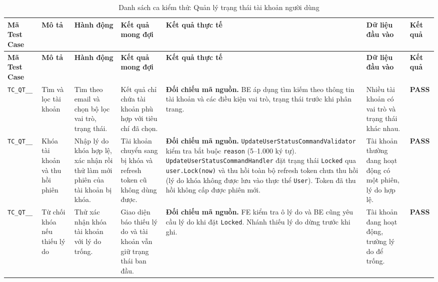 \begin{landscape}
{
\fontsize{9.5}{11.5}\selectfont
\setlength{\tabcolsep}{3pt}
\renewcommand{\arraystretch}{1.2}
\begin{longtable}{|>{\raggedright\arraybackslash}p{2.1cm}|>{\raggedright\arraybackslash}p{2.8cm}|>{\raggedright\arraybackslash}p{3.8cm}|>{\raggedright\arraybackslash}p{4.0cm}|>{\raggedright\arraybackslash}p{5.0cm}|>{\raggedright\arraybackslash}p{3.2cm}|>{\centering\arraybackslash}p{1.3cm}|}
    \caption{Danh sách ca kiểm thử: Quản lý trạng thái tài khoản người dùng} \label{tab:ts-qt-02} \\
    \hline
    \textbf{Mã Test Case} & \textbf{Mô tả} & \textbf{Hành động} & \textbf{Kết quả mong đợi} & \textbf{Kết quả thực tế} & \textbf{Dữ liệu đầu vào} & \textbf{Kết quả} \\
    \hline
    \endfirsthead
    \hline
    \textbf{Mã Test Case} & \textbf{Mô tả} & \textbf{Hành động} & \textbf{Kết quả mong đợi} & \textbf{Kết quả thực tế} & \textbf{Dữ liệu đầu vào} & \textbf{Kết quả} \\
    \hline
    \endhead
    \hline
    \endfoot
    \hline
    \endlastfoot
    \texttt{TC\_\allowbreak QT\_\allowbreak 02\_\allowbreak 01} & Tìm và lọc tài khoản & Tìm theo email và chọn bộ lọc vai trò, trạng thái. & Kết quả chỉ chứa tài khoản phù hợp với tiêu chí đã chọn. & \textbf{Đối chiếu mã nguồn.} BE áp dụng tìm kiếm theo thông tin tài khoản và các điều kiện vai trò, trạng thái trước khi phân trang. & Nhiều tài khoản có vai trò và trạng thái khác nhau. & \textbf{PASS} \\
    \hline
    \texttt{TC\_\allowbreak QT\_\allowbreak 02\_\allowbreak 02} & Khóa tài khoản và thu hồi phiên & Nhập lý do khóa hợp lệ, xác nhận rồi thử làm mới phiên của tài khoản bị khóa. & Tài khoản chuyển sang bị khóa và refresh token cũ không dùng được. & \textbf{Đối chiếu mã nguồn.} \texttt{UpdateUserStatusCommandValidator} kiểm tra bắt buộc \texttt{reason} (5–1.000 ký tự). \texttt{UpdateUserStatusCommandHandler} đặt trạng thái \texttt{Locked} qua \texttt{user.Lock(now)} và thu hồi toàn bộ refresh token chưa thu hồi (lý do khóa không được lưu vào thực thể \texttt{User}). Token đã thu hồi không cấp được phiên mới. & Tài khoản thường đang hoạt động có một phiên, lý do hợp lệ. & \textbf{PASS} \\
    \hline
    \texttt{TC\_\allowbreak QT\_\allowbreak 02\_\allowbreak 03} & Từ chối khóa nếu thiếu lý do & Thử xác nhận khóa tài khoản với lý do trống. & Giao diện báo thiếu lý do và tài khoản vẫn giữ trạng thái ban đầu. & \textbf{Đối chiếu mã nguồn.} FE kiểm tra ô lý do và BE cũng yêu cầu lý do khi đặt \texttt{Locked}. Nhánh thiếu lý do dừng trước khi ghi. & Tài khoản đang hoạt động, trường lý do để trống. & \textbf{PASS} \\

\end{longtable}}
\end{landscape}
